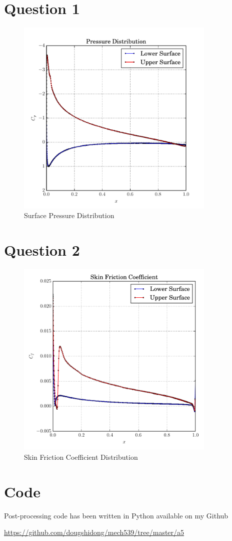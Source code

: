 \documentclass[letterpaper,12pt,]{article}
\begin{document}


\section*{Question 1}

\begin{figure}[!ht]
    \centering
    \includegraphics[width = 0.85\textwidth]{./Figures/q1.pdf}
    \caption {Surface Pressure Distribution}
    \label{fig:q1}
\end{figure}

\section*{Question 2}

\begin{figure}[!ht]
    \centering
    \includegraphics[width = 0.85\textwidth]{./Figures/q2.pdf}
    \caption {Skin Friction Coefficient Distribution}
    \label{fig:q1}
\end{figure}

\section*{Code}

Post-processing code has been written in Python available on my Github

\url{https://github.com/dougshidong/mech539/tree/master/a5}
\end{document}

